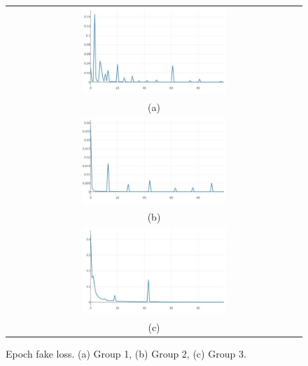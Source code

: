 \documentclass[10pt,twocolumn,letterpaper]{article}
\begin{document}
\begin{figure}%
\centering\begin{tabular}{c}
\includegraphics[width=0.5\textwidth]{fig18-a}\\
(a)\\[3ex]%
\includegraphics[width=0.5\textwidth]{fig18-b}\\
(b)\\[3ex]
\includegraphics[width=0.5\textwidth]{fig18-c}\\
(c)
\end{tabular}
\caption{Epoch fake loss. (a) Group 1, (b) Group 2, (c) Group 3.}%
\label{fig18}%
\end{figure}
\end{document}
